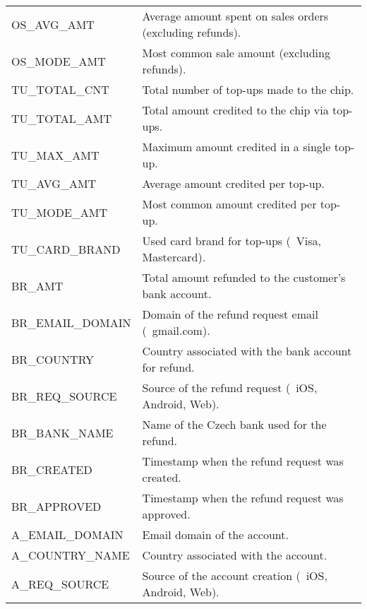 \begin{table}[H]
\begin{tabular}{|>{\columncolor{unicorn_blue!5}}l|>{\columncolor{unicorn_blue!5}}l|}
		OS\_AVG\_AMT                         & Average amount spent on sales orders (excluding refunds).    \\
		OS\_MODE\_AMT                        & Most common sale amount (excluding refunds).                 \\
		TU\_TOTAL\_CNT                       & Total number of top-ups made to the chip.                    \\
		TU\_TOTAL\_AMT                       & Total amount credited to the chip via top-ups.               \\
		TU\_MAX\_AMT                         & Maximum amount credited in a single top-up.                  \\
		TU\_AVG\_AMT                         & Average amount credited per top-up.                          \\
		TU\_MODE\_AMT                        & Most common amount credited per top-up.                      \\
		TU\_CARD\_BRAND                      & Used card brand for top-ups (\eg~Visa, Mastercard).          \\
		\hline
		BR\_AMT                              & Total amount refunded to the customer's bank account.        \\
		BR\_EMAIL\_DOMAIN                    & Domain of the refund request email (\eg~gmail.com).          \\
		BR\_COUNTRY                          & Country associated with the bank account for refund.         \\
		BR\_REQ\_SOURCE                      & Source of the refund request (\eg~iOS, Android, Web).        \\
		BR\_BANK\_NAME                       & Name of the Czech bank used for the refund.                  \\
		BR\_CREATED                          & Timestamp when the refund request was created.               \\
		BR\_APPROVED                         & Timestamp when the refund request was approved.              \\
		\hline
		A\_EMAIL\_DOMAIN                     & Email domain of the account.                                 \\
		A\_COUNTRY\_NAME                     & Country associated with the account.                         \\
		A\_REQ\_SOURCE                       & Source of the account creation (\eg~iOS, Android, Web).      \\

\end{tabular}
\end{table}
